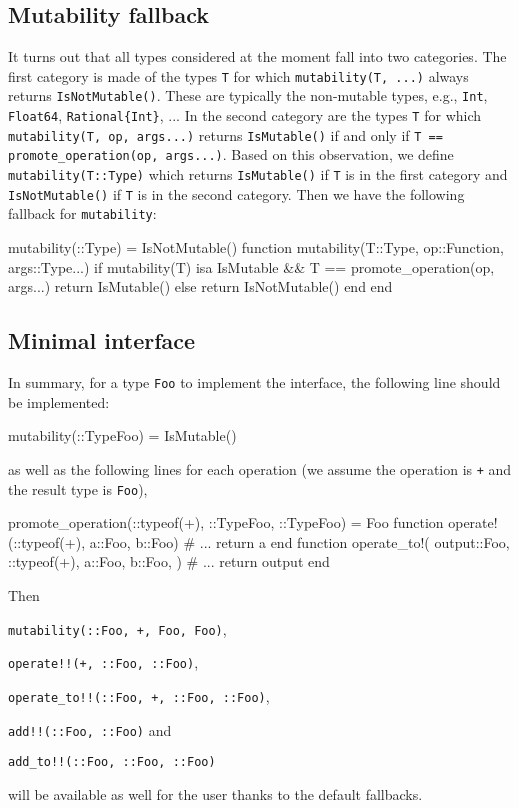 \documentclass{juliacon}
\begin{document}
\subsection{Mutability fallback}
It turns out that all types considered at the moment fall into two categories.
The first category is made of the types \lstinline|T| for which
\lstinline|mutability(T, ...)| always returns \lstinline|IsNotMutable()|.
These are typically the non-mutable types, e.g., \lstinline|Int|, \lstinline|Float64|, \lstinline|Rational{Int}|, ...
In the second category are the types \lstinline|T| for which
\lstinline|mutability(T, op, args...)| returns \lstinline|IsMutable()|
if and only if \lstinline|T == promote_operation(op, args...)|.
Based on this observation, we define \lstinline|mutability(T::Type)| which
returns \lstinline|IsMutable()| if \lstinline|T| is in the first category
and \lstinline|IsNotMutable()| if \lstinline|T| is in the second category.
Then we have the following fallback for \lstinline|mutability|:
\begin{jllisting}
mutability(::Type) = IsNotMutable()
function mutability(T::Type, op::Function, args::Type...)
    if mutability(T) isa IsMutable &&
        T == promote_operation(op, args...)
        return IsMutable()
    else
        return IsNotMutable()
    end
end
\end{jllisting}

\subsection{Minimal interface}
In summary, for a type \lstinline|Foo| to implement the interface,
the following line should be implemented:
\begin{jllisting}
mutability(::Type{Foo}) = IsMutable()
\end{jllisting}
as well as the following lines for each operation
(we assume the operation is \lstinline|+|
and the result type is \lstinline|Foo|),
\begin{jllisting}
promote_operation(::typeof(+), ::Type{Foo}, ::Type{Foo}) =
    Foo
function operate!(::typeof(+), a::Foo, b::Foo)
    # ...
    return a
end
function operate_to!(
    output::Foo,
    ::typeof(+),
    a::Foo,
    b::Foo,
)
    # ...
    return output
end
\end{jllisting}
Then
\begin{unnumlist}
  \item \lstinline|mutability(::Foo, +, Foo, Foo)|,
  \item \lstinline|operate!!(+, ::Foo, ::Foo)|,
  \item \lstinline|operate_to!!(::Foo, +, ::Foo, ::Foo)|,
  \item \lstinline|add!!(::Foo, ::Foo)| and
  \item \lstinline|add_to!!(::Foo, ::Foo, ::Foo)|
\end{unnumlist}
will be available as well for the user thanks to the default fallbacks.
\end{document}
